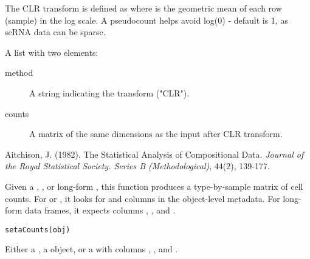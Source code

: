 \documentclass[a4paper]{book}
\begin{document}
%
\begin{Details}
The CLR transform is defined as 
where  is the geometric mean
of each row (sample) in the log scale.
A pseudocount helps avoid log(0) - default is 1, as scRNA data can be sparse.
\end{Details}
%
\begin{Value}
A list with two elements:
\begin{description}

\item[method] A string indicating the transform ("CLR").
\item[counts] A matrix of the same dimensions
as the input after CLR transform.

\end{description}

\end{Value}
%
\begin{References}
Aitchison, J. (1982). The Statistical Analysis of Compositional Data.
\emph{Journal of the Royal Statistical Society.
Series B (Methodological)}, 44(2), 139-177.
\end{References}
%
\begin{Examples}
\end{Examples}
%
\begin{Description}
Given a , , or long-form ,
this function produces a type-by-sample matrix of cell counts. For 
or , it looks for  and  columns in the object-level metadata.
For long-form data frames, it expects columns , , and .
\end{Description}
%
\begin{Usage}
\begin{verbatim}
setaCounts(obj)
\end{verbatim}
\end{Usage}
%
\begin{Arguments}
\begin{ldescription}
\item[\code{obj}] Either a , a  object, or
a  with columns , , and .
\end{ldescription}
\end{Arguments}
\end{document}
